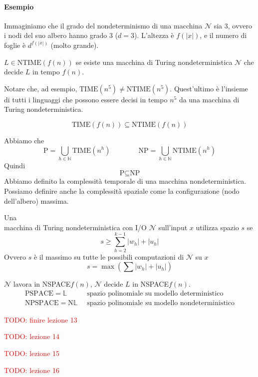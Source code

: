 \paragraph{Esempio} Immaginiamo che il grado del nondeterminismo di una macchina $\mathcal{N}$ sia 3, ovvero i nodi del suo albero hanno grado 3 ($d=3$). L'altezza è $f(|x|)$, e il numero di foglie è $d^{f(|x|)}$ (molto grande).


\begin{definition}
    $L\in\text{NTIME}(f(n))$ se esiste una macchina di Turing nondeterministica $\mathcal{N}$ che decide $L$ in tempo $f(n)$.
\end{definition}
Notare che, ad esempio, $\text{TIME}(n^5)\neq\text{NTIME}(n^5)$. Quest'ultimo è l'insieme di tutti i linguaggi che possono essere decisi in tempo $n^5$ da una macchina di Turing nondeterministica.

\begin{proposition}
    $$
        \text{TIME}(f(n)) \subseteq \text{NTIME}(f(n))
    $$
\end{proposition}
Abbiamo che
$$
    \text{P} = \bigcup_{h\in\mathbb{N}} \text{TIME}(n^h)
    \qquad \qquad 
    \text{NP} = \bigcup_{h\in\mathbb{N}} \text{NTIME}(n^h)
$$
Quindi
$$
    \text{P} \subseteq \text{NP}
$$
Abbiamo definito la complessità temporale di una macchina nondeterministica. Possiamo definire anche la complessità spaziale come la configurazione (nodo dell'albero) massima.
\begin{definition}
    Una\\macchina di Turing nondeterministica con I/O $\mathcal{N}$ sull'input $x$ utilizza spazio $s$ se 
    $$
        s \geq \sum_{h=2}^{k-1} |w_h| + |u_h|
    $$
    Ovvero $s$ è il massimo su tutte le possibili computazioni di $\mathcal{N}$ su $x$
    $$
        s = \max\left( \sum |w_h| + |u_h| \right)
    $$
\end{definition}
$\mathcal{N}$ lavora in NSPACE$f(n)$, $\mathcal{N}$ decide $L$ in NSPACE$f(n)$.
\begin{align*}
    \text{PSPACE}=\mathbb{L} & ~\text{ spazio polinomiale su modello deterministico}\\
    \text{NPSPACE}=\text{N}\mathbb{L} & ~\text{ spazio polinomiale su modello nondeterministico} 
\end{align*}


\textcolor{Red}{TODO: finire lezione 13}


\textcolor{Red}{TODO: lezione 14}

\textcolor{Red}{TODO: lezione 15}

\textcolor{Red}{TODO: lezione 16}
